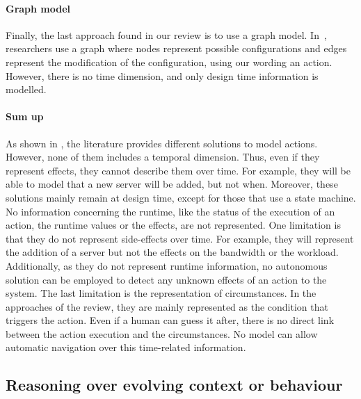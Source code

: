 \paragraph{Graph model}
Finally, the last approach found in our review is to use a graph model.
In~\cite{DBLP:journals/computer/GeorgasHT09}, researchers use a graph where nodes represent possible configurations and edges represent the modification of the configuration, using our wording an \gls{action}.
However, there is no time dimension, and only design time information is modelled.

\paragraph{Sum up}
As shown in , the literature provides different solutions to model \glspl{action}.
However, none of them includes a temporal dimension.
Thus, even if they represent effects, they cannot describe them over time.
For example, they will be able to model that a new server will be added, but not when.
Moreover, these solutions mainly remain at design time, except for those that use a state machine.
No information concerning the runtime, like the status of the execution of an action, the runtime values or the effects, are not represented.
One limitation is that they do not represent side-effects over time.
For example, they will represent the addition of a server but not the effects on the bandwidth or the workload.
Additionally, as they do not represent runtime information, no autonomous solution can be employed to detect any unknown effects of an action to the system.
The last limitation is the representation of \glspl{circumstance}.
In the approaches of the review, they are mainly represented as the condition that triggers the action.
Even if a human can guess it after, there is no direct link between the action execution and the circumstances.
No model can allow automatic navigation over this time-related information. 

\subsection[Reasoning over evolving context or behaviour]{Reasoning over evolving context or \gls{behaviour}}

